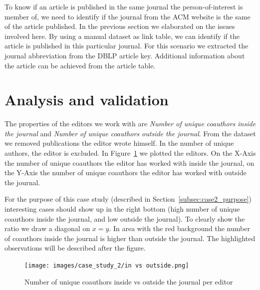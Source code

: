 \documentclass{ou-report}
\newcommand{\outline}[1]{{\color{blue} #1}}
\begin{document}
To know if an article is published in the same journal the person-of-interest 
is member of, we need to identify if the journal from the ACM website is the 
same of the article published. In the previous section we elaborated on the 
issues involved here. By using a manual dataset as link table, we can identify
if the article is published in this particular journal. For this scenario we
extracted the journal abbreviation from the DBLP article key.
Additional information about the article can be achieved from the article table.

\section{Analysis and validation}

The properties of the editors we work with are \textit{Number of unique 
coauthors inside the journal} and \textit{Number of unique 
coauthors outside the journal}. From the dataset we removed publications the 
editor wrote himself. In the number of unique authors, the editor is excluded.
In Figure~\ref{fig:editors_in_out_journal} we plotted the editors.
On the X-Axis
the number of unique coauthors the editor has worked with inside the journal, on 
the Y-Axis the number of unique coauthors the editor has worked with outside the 
journal. 

For the purpose of this case study (described in 
Section~\ref{subsec:case2_purpose}) interesting cases should show up in the right 
bottom (high number of unique coauthors inside the journal, and low outside the 
journal).
To clearly show the ratio we draw a diagonal on \(x = y\). In area with the red 
background the number of coauthors inside the journal is higher than outside the 
journal.
The highlighted observations will be described after the figure.

\begin{figure}
    \centering
    \texttt{[image: images/case\_study\_2/in vs outside.png]}
    \caption{Number of unique coauthors inside vs outside the journal per editor}
    \label{fig:editors_in_out_journal}
\end{figure}
\end{document}
